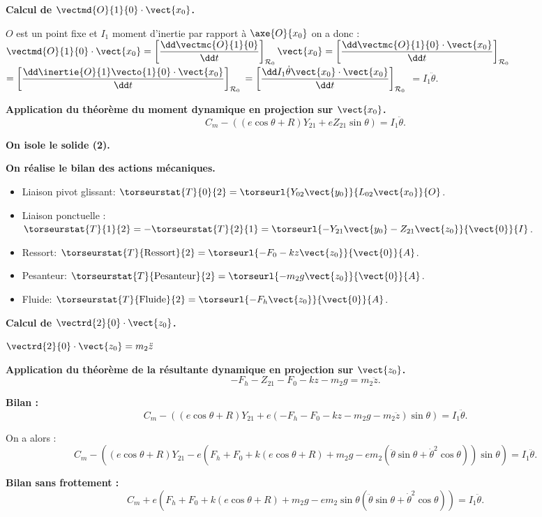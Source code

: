 \textbf{Calcul de $\vectmd{O}{1}{0}\cdot \vect{x_0}$.}
 
$O$ est un point fixe et $I_1$ moment d'inertie par rapport à $\axe{O}{x_0}$ on a donc : 
$\vectmd{O}{1}{0}\cdot \vect{x_0}
=\left[\dfrac{\dd \vectmc{O}{1}{0}}{\dd t}\right]_{\mathcal{R}_0}\vect{x_0}
=\left[\dfrac{\dd \vectmc{O}{1}{0}\cdot \vect{x_0}}{\dd t}  \right]_{\mathcal{R}_0}$
$=\left[\dfrac{\dd \inertie{O}{1}\vecto{1}{0}\cdot \vect{x_0}}{\dd t}  \right]_{\mathcal{R}_0}$
$=\left[\dfrac{\dd I_1\dot{\theta}\vect{x_0}\cdot \vect{x_0}}{\dd t}  \right]_{\mathcal{R}_0}$
$=I_1\ddot{\theta}$.

\textbf{Application du théorème du moment dynamique en projection sur $\vect{x_0}$.}
$$
C_m-\left(\left(e\cos\theta+R\right)Y_{21} +e Z_{21}\sin\theta\right) =I_1\ddot{\theta}.
$$

\textbf{On isole le solide \textbf{(2)}.}

\textbf{On réalise le bilan des actions mécaniques.}
\begin{itemize}
\item Liaison pivot glissant: $\torseurstat{T}{0}{2}
=\torseurl{Y_{02}\vect{y_0}}{L_{02}\vect{x_0}}{O}$.
\item Liaison ponctuelle : $\torseurstat{T}{1}{2}=-\torseurstat{T}{2}{1}
=\torseurl{-Y_{21}\vect{y_0}-Z_{21}\vect{z_0}}{\vect{0}}{I}$. 
\item Ressort: $\torseurstat{T}{\text{Ressort}}{2}
=\torseurl{-F_0-kz\vect{z_0}}{\vect{0}}{A}$.
\item Pesanteur: $\torseurstat{T}{\text{Pesanteur}}{2}
=\torseurl{-m_2g\vect{z_0}}{\vect{0}}{A}$.
\item Fluide: $\torseurstat{T}{\text{Fluide}}{2}
=\torseurl{-F_h\vect{z_0}}{\vect{0}}{A}$.

\end{itemize}

\textbf{Calcul de $\vectrd{2}{0}\cdot \vect{z_0}$.}
 
$\vectrd{2}{0}\cdot \vect{z_0}=m_2\ddot{z}$

\textbf{Application du théorème de la résultante dynamique en projection sur $\vect{z_0}$.}
$$
-F_h-Z_{21}-F_0-kz-m_2g=m_2\ddot{z}.
$$


\textbf{Bilan :}
$$C_m-\left(\left(e\cos\theta+R\right)Y_{21} +e \left( -F_h-F_0-kz-m_2g-m_2\ddot{z}\right)\sin\theta\right) =I_1\ddot{\theta}.$$

On a alors :
$$C_m-\left(\left(e\cos\theta+R\right)Y_{21} -e \left( F_h+F_0+k\left( e\cos\theta+R \right)+m_2g-em_2\left( \ddot{\theta}\sin\theta+\dot{\theta}^2\cos\theta\right)\right)\sin\theta\right) =I_1\ddot{\theta}.$$


\textbf{Bilan sans frottement :}
$$C_m+e\left(
F_h+F_0+k\left( e\cos\theta+R \right)+m_2g
-em_2\sin\theta\left( \ddot{\theta}\sin\theta+\dot{\theta}^2\cos\theta\right)
\right) =I_1\ddot{\theta}.$$
\else
\fi
